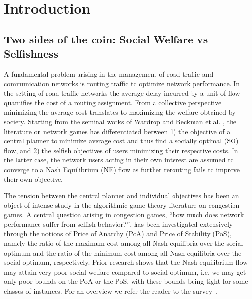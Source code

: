 \section{Introduction}\label{sec:intro}

\subsection{Two sides of the coin: Social Welfare vs Selfishness} \label{subSect:SOFandFairF}
A fundamental problem arising in the management of road-traffic and communication networks is routing traffic to optimize network performance. In the setting of road-traffic networks the average delay incurred by a unit of flow quantifies the cost of a routing assignment.  From a collective perspective minimizing the average cost translates to maximizing the welfare obtained by society.  
Starting from the seminal works of Wardrop \cite{wardrop1952some} and Beckman et al. \cite{beckmann1956studies}, the literature on network games has differentiated between 1) the objective of a central planner to minimize average cost and thus find a socially optimal (SO) flow, and 2) the selfish objectives of users minimizing their respective costs.  In the latter case,  
the network users acting in their own interest are assumed to converge to a Nash Equilibrium (NE) flow as further rerouting fails to improve their own objective.  

The tension between the central planner and individual objectives has been an object of intense study in the 
algorithmic game theory literature on congestion games. A central question arising in congestion games, ``how much does network performance suffer from selfish behavior?'', has been investigated extensively through the notions of Price of Anarchy (PoA) and Price of Stability (PoS), namely the ratio of the maximum cost among all Nash equilibria over the social optimum and the ratio of the minimum cost among all  Nash equilibria over the social optimum, respectively. Prior research shows that the Nash equilibrium flow may attain very poor social welfare compared to social optimum, i.e. we may get only poor bounds on the PoA or the PoS, with these bounds being tight for some classes of instances.  For an overview we refer the reader to the survey~\cite{roughgarden2002selfish}. %

